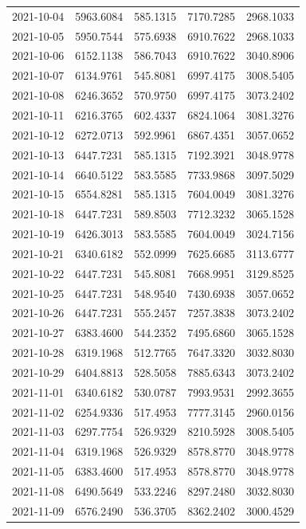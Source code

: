 \begin{footnotesize}
\begin{longtable}{lllll}
2021-10-04 & 5963.6084 & 585.1315 & 7170.7285 & 2968.1033 \\
2021-10-05 & 5950.7544 & 575.6938 & 6910.7622 & 2968.1033 \\
2021-10-06 & 6152.1138 & 586.7043 & 6910.7622 & 3040.8906 \\
2021-10-07 & 6134.9761 & 545.8081 & 6997.4175 & 3008.5405 \\
2021-10-08 & 6246.3652 & 570.9750 & 6997.4175 & 3073.2402 \\
2021-10-11 & 6216.3765 & 602.4337 & 6824.1064 & 3081.3276 \\
2021-10-12 & 6272.0713 & 592.9961 & 6867.4351 & 3057.0652 \\
2021-10-13 & 6447.7231 & 585.1315 & 7192.3921 & 3048.9778 \\
2021-10-14 & 6640.5122 & 583.5585 & 7733.9868 & 3097.5029 \\
2021-10-15 & 6554.8281 & 585.1315 & 7604.0049 & 3081.3276 \\
2021-10-18 & 6447.7231 & 589.8503 & 7712.3232 & 3065.1528 \\
2021-10-19 & 6426.3013 & 583.5585 & 7604.0049 & 3024.7156 \\
2021-10-21 & 6340.6182 & 552.0999 & 7625.6685 & 3113.6777 \\
2021-10-22 & 6447.7231 & 545.8081 & 7668.9951 & 3129.8525 \\
2021-10-25 & 6447.7231 & 548.9540 & 7430.6938 & 3057.0652 \\
2021-10-26 & 6447.7231 & 555.2457 & 7257.3838 & 3073.2402 \\
2021-10-27 & 6383.4600 & 544.2352 & 7495.6860 & 3065.1528 \\
2021-10-28 & 6319.1968 & 512.7765 & 7647.3320 & 3032.8030 \\
2021-10-29 & 6404.8813 & 528.5058 & 7885.6343 & 3073.2402 \\
2021-11-01 & 6340.6182 & 530.0787 & 7993.9531 & 2992.3655 \\
2021-11-02 & 6254.9336 & 517.4953 & 7777.3145 & 2960.0156 \\
2021-11-03 & 6297.7754 & 526.9329 & 8210.5928 & 3008.5405 \\
2021-11-04 & 6319.1968 & 526.9329 & 8578.8770 & 3048.9778 \\
2021-11-05 & 6383.4600 & 517.4953 & 8578.8770 & 3048.9778 \\
2021-11-08 & 6490.5649 & 533.2246 & 8297.2480 & 3032.8030 \\
2021-11-09 & 6576.2490 & 536.3705 & 8362.2402 & 3000.4529 \\

\end{longtable}
\end{footnotesize}
